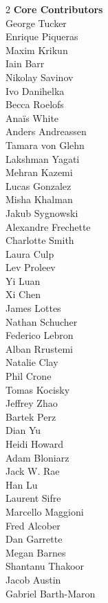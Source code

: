 \begin{multicols}{2}
\setlength{\parindent}{0pt}
\textbf{Core Contributors} \\
George Tucker \\ 
Enrique Piqueras \\
Maxim Krikun \\
Iain Barr \\
Nikolay Savinov \\
Ivo Danihelka \\
Becca Roelofs \\
Anaïs White \\
Anders Andreassen \\
Tamara von Glehn \\
Lakshman Yagati \\
Mehran Kazemi \\
Lucas Gonzalez \\
Misha Khalman \\
Jakub Sygnowski \\
Alexandre Frechette \\
Charlotte Smith \\
Laura Culp \\
Lev Proleev \\
Yi Luan \\
Xi Chen \\
James Lottes \\
Nathan Schucher \\
Federico Lebron \\
Alban Rrustemi \\
Natalie Clay \\
Phil Crone \\
Tomas Kocisky \\
Jeffrey Zhao \\
Bartek Perz \\
Dian Yu \\
Heidi Howard \\
Adam Bloniarz \\
Jack W. Rae \\
Han Lu \\
Laurent Sifre \\
Marcello Maggioni \\
Fred Alcober \\
Dan Garrette \\
Megan Barnes \\
Shantanu Thakoor \\
Jacob Austin \\
Gabriel Barth-Maron \\

\end{multicols}
